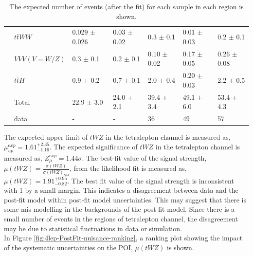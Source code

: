 \begin{table}[h!]
{\begin{tabular}{|l|l|l|l|l|l|l|}
                        & $t\bar{t}WW$          & 0.029 $\pm$ 0.026     & 0.03 $\pm$ 0.02    & 0.3 $\pm$ 0.1      & 0.01 $\pm$ 0.03     & 0.2 $\pm$ 0.1    \\
                        & $VVV (V = W/Z)$          & 0.3 $\pm$ 0.1     & 0.2 $\pm$ 0.1    & 0.10 $\pm$ 0.02     & 0.17 $\pm$ 0.05      & 0.26 $\pm$ 0.08  \\
                        & $t\bar{t}H$           & 0.9 $\pm$ 0.2       & 0.7 $\pm$ 0.1     & 2.0 $\pm$ 0.4      & 0.20 $\pm$ 0.03      & 2.2 $\pm$ 0.5     \\\hline
                        & Total         & 22.9 $\pm$ 3.0         & 24.0 $\pm$ 2.1       & 39.4 $\pm$ 3.4         & 49.1 $\pm$ 6.0         & 53.4 $\pm$ 4.3      \\ \hline
                        & data          & -                                         & -                                      & 36                                         & 49                                         & 57                                      \\ \hline
\end{tabular}}
\caption{The expected number of events (after the fit) for each sample in each region is shown.}
\label{tab:4Lep-PostFit-Yields}
\end{table}

The expected upper limit of $tWZ$ in the tetralepton channel is measured as, $\mu_{up}^{exp} =   1.61^{+2.35}_{-1.16}$. The expected significance of $tWZ$ in the tetralepton channel is measured as, $Z_{\mu}^{exp} =   1.44\sigma$. The best-fit value of the signal strength, $\mu (tWZ)= \frac{\sigma(tWZ)}{\sigma(tWZ)_{SM}}$, from the likelihood fit is measured as, $\mu (tWZ) = 1.91^{+0.95}_{-0.82}$. The best fit value of the signal strength is inconsistent with 1 by a small margin. This indicates a disagreement between data and the post-fit model within post-fit model uncertainties. This may suggest that there is some mis-modelling in the backgrounds of the post-fit model. Since there is a small number of events in the regions of tetralepton channel, the disagreement may be due to statistical fluctuations in data or simulation.\\

In Figure \ref{fig:4lep-PostFit-nuisance-ranking}, a ranking plot showing the impact of the systematic uncertainties on the POI, $\mu (tWZ)$ is shown.


